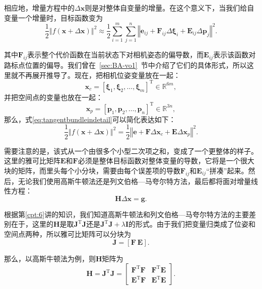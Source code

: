 相应地，增量方程中的$\Delta \bm{x}$则是对整体自变量的增量。在这个意义下，当我们给自变量一个增量时，目标函数变为
\begin{equation}
\label{eq:tangentbundleindetail}
\frac{1}{2}\left\Vert f(\bm{x} + \Delta \bm{x}) \right\Vert ^2 \approx \frac{1}{2}\sum_{i=1}^{m}\sum_{j=1}^n \left\Vert \bm{e}_{ij} + \bm{F}_{ij} \Delta \bm{\xi}_{i} + \bm{E}_{ij} \Delta \bm{p}_j \right\Vert^2 .
\end{equation}

其中$\bm{F}_{ij}$表示整个代价函数在当前状态下对相机姿态的偏导数，而$\bm{E}_{ij}$表示该函数对路标点位置的偏导。我们曾在~\ref{sec:BA-vo1}~节中介绍了它们的具体形式，所以这里就不再展开推导了。现在，把相机位姿变量放在一起：
\begin{equation}
\bm{x}_c=[ \bm{\xi}_1, \bm{\xi}_2, \ldots, \bm{\xi}_m ]^\mathrm{T} \in \mathbb{R}^{6m},
\end{equation}
并把空间点的变量也放在一起：
\begin{equation}
\bm{x}_p=[ \bm{p}_1, \bm{p}_2, \ldots, \bm{p}_n ]^\mathrm{T}\in \mathbb{R}^{3n},
\end{equation}
那么，式\eqref{eq:tangentbundleindetail}可以简化表达如下：
\begin{equation}
\label{eq:BAleastsquare}
\frac{1}{2}
\left\Vert 
f(\bm{x}+ \Delta \bm{x} )
\right\Vert ^2 = 
\frac{1}{2} 
\left\Vert 
\bm{e} + \bm{F}\Delta \bm{x}_c + \bm{E} \Delta \bm{x}_p 
\right \Vert ^2 .
\end{equation}

需要注意的是，该式从一个由很多个小型二次项之和，变成了一个更整体的样子。这里的雅可比矩阵$\bm{E}$和$\bm{F}$必须是整体目标函数对整体变量的导数，它将是一个很大块的矩阵，而里头每个小分块，需要由每个误差项的导数$\bm{F}_{ij}$和$\bm{E}_{ij}$“拼凑”起来。然后，无论我们使用高斯牛顿法还是列文伯格—马夸尔特方法，最后都将面对增量线性方程：
\begin{equation}
\bm{H} \Delta \bm{x} = \bm{g}.
\end{equation}

根据第\ref{cpt:6}讲的知识，我们知道高斯牛顿法和列文伯格—马夸尔特方法的主要差别在于，这里的$\bm{H}$是取$\bm{J}^\mathrm{T}\bm{J}$还是$\bm{J}^\mathrm{T}\bm{J}+ \lambda \bm{I}$的形式。由于我们把变量归类成了位姿和空间点两种，所以雅可比矩阵可以分块为
\begin{equation}
\bm{J}=[\bm{F} \ \bm{E}].
\end{equation}

那么，以高斯牛顿法为例，则$\bm{H}$矩阵为
\begin{equation}\label{eq:HessianMatrix}
\bm{H} = \bm{J}^\mathrm{T}\bm{J} =
\begin{bmatrix}
         \bm{F}^\mathrm{T}\bm{F}   &   \bm{F}^\mathrm{T}\bm{E}   \\ 
         \bm{E}^\mathrm{T}\bm{F}   &   \bm{E}^\mathrm{T}\bm{E}
\end{bmatrix} .
\end{equation}

